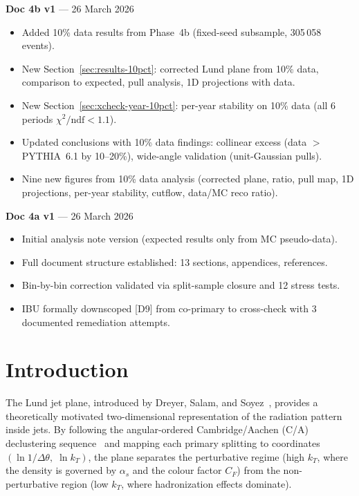 \documentclass[11pt,a4paper]{article}
\begin{document}
\medskip

\textbf{Doc 4b v1} --- 26 March 2026
\begin{itemize}
\item Added 10\% data results from Phase~4b (fixed-seed subsample, 305\,058 events).
\item New Section~\ref{sec:results-10pct}: corrected Lund plane from 10\% data, comparison to expected, pull analysis, 1D projections with data.
\item New Section~\ref{sec:xcheck-year-10pct}: per-year stability on 10\% data (all 6 periods $\chi^2/\text{ndf} < 1.1$).
\item Updated conclusions with 10\% data findings: collinear excess (data $>$ PYTHIA~6.1 by 10--20\%), wide-angle validation (unit-Gaussian pulls).
\item Nine new figures from 10\% data analysis (corrected plane, ratio, pull map, 1D projections, per-year stability, cutflow, data/MC reco ratio).
\end{itemize}

\medskip

\textbf{Doc 4a v1} --- 26 March 2026
\begin{itemize}
\item Initial analysis note version (expected results only from MC pseudo-data).
\item Full document structure established: 13 sections, appendices, references.
\item Bin-by-bin correction validated via split-sample closure and 12 stress tests.
\item IBU formally downscoped [D9] from co-primary to cross-check with 3 documented remediation attempts.
\end{itemize}

\clearpage

\section{Introduction}
\label{sec:intro}

The Lund jet plane, introduced by Dreyer, Salam, and
Soyez~\cite{Dreyer:2018nbf}, provides a theoretically motivated
two-dimensional representation of the radiation pattern inside jets.
By following the angular-ordered Cambridge/Aachen (C/A)
declustering sequence~\cite{Dokshitzer:1997in} and mapping each
primary splitting to coordinates
$(\ln 1/\Delta\theta,\;\ln k_T)$, the plane separates the
perturbative regime (high $k_T$, where the density is governed by
$\alpha_s$ and the colour factor $C_F$) from the non-perturbative
region (low $k_T$, where hadronization effects dominate).
\end{document}
